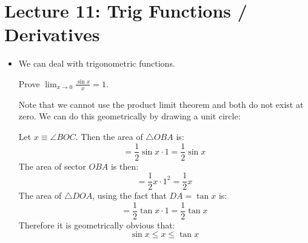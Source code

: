 \section{Lecture 11: Trig Functions / Derivatives}
\begin{itemize}
    \item We can deal with trigonometric functions.
    \begin{example}
        Prove $\displaystyle \lim_{x\to 0} \frac{\sin x}{x}=1$.
        \vspace{2mm}

        Note that we cannot use the product limit theorem and both do not exist at zero. We can do this geometrically by drawing a unit circle:
        \begin{center}
        \end{center}
        Let $x\equiv \angle BOC$. Then the area of $\triangle OBA$ is:
        \begin{equation}
            [\triangle OBA] = \frac{1}{2}\sin x \cdot 1 = \frac{1}{2}\sin x
            \label{eq:}
        \end{equation}
        The area of sector $OBA$ is then:
        \begin{equation}
            [OBA] = \frac{1}{2}x\cdot 1^2 = \frac{1}{2}x
            \label{eq:}
        \end{equation}
        The area of $\triangle DOA$, using the fact that $DA=\tan x$ is:
        \begin{equation}
            [\triangle DOA] = \frac{1}{2}\tan x \cdot 1 = \frac{1}{2}\tan x
            \label{eq:}
        \end{equation}
        Therefore it is geometrically obvious that:
        \begin{equation}
            \sin x \le x \le \tan x
            \label{eq:}

\end{equation}
\end{example}
\end{itemize}
